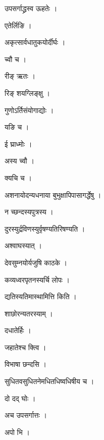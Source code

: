 \documentclass[10pt, openany]{book}
\begin{document}
\noindent उपसर्गाद्ध्रस्व ऊहतेः ।

\noindent एतेर्लिङि ।

\noindent अकृत्सार्वधातुकयोर्दीर्घः ।

\noindent च्वौ च ।

\noindent रीङ् ऋतः ।

\noindent रिङ् शयग्लिङ्क्षु ।

\noindent गुणोऽर्तिसंयोगाद्योः ।

\noindent यङि च ।

\noindent ई घ्राध्मोः ।

\noindent अस्य च्वौ ।

\noindent क्यचि च ।

\noindent अशनायोदन्यधनाया बुभुक्षापिपासागर्द्धेषु ।

\noindent न च्छन्दस्यपुत्रस्य ।

\noindent दुरस्युर्द्रविणस्युर्वृषण्यतिरिषण्यति ।

\noindent अश्वाघस्यात् ।

\noindent देवसुम्नयोर्यजुषि काठके ।

\noindent कव्यध्वरपृतनस्यर्चि लोपः ।

\noindent द्यतिस्यतिमास्थामित्ति किति ।

\noindent शाछोरन्यतरस्याम् ।

\noindent दधातेर्हिः ।

\noindent जहातेश्च क्त्वि ।

\noindent विभाषा छन्दसि ।

\noindent सुधितवसुधितनेमधितधिष्वधिषीय च ।

\noindent दो दद् घोः ।

\noindent अच उपसर्गात्तः ।

\noindent अपो भि ।
\end{document}
